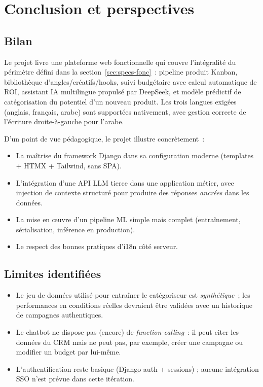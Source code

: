 \section{Conclusion et perspectives}
\label{sec:conclusion}

\subsection{Bilan}

Le projet livre une plateforme web fonctionnelle qui couvre l'intégralité
du périmètre défini dans la section~\ref{sec:specs-fonc}~: pipeline produit
Kanban, bibliothèque d'angles/créatifs/hooks, suivi budgétaire avec calcul
automatique de ROI, assistant IA multilingue propulsé par DeepSeek, et
modèle prédictif de catégorisation du potentiel d'un nouveau produit. Les
trois langues exigées (anglais, français, arabe) sont supportées
nativement, avec gestion correcte de l'écriture droite-à-gauche pour
l'arabe.

D'un point de vue pédagogique, le projet illustre concrètement~:
\begin{itemize}
    \item La maîtrise du framework Django dans sa configuration moderne
    (templates + HTMX + Tailwind, sans SPA).
    \item L'intégration d'une API LLM tierce dans une application métier,
    avec injection de contexte structuré pour produire des réponses
    \emph{ancrées} dans les données.
    \item La mise en œuvre d'un pipeline ML simple mais complet
    (entraînement, sérialisation, inférence en production).
    \item Le respect des bonnes pratiques d'i18n côté serveur.
\end{itemize}

\subsection{Limites identifiées}

\begin{itemize}
    \item Le jeu de données utilisé pour entraîner le catégoriseur est
    \emph{synthétique}~; les performances en conditions réelles devraient
    être validées avec un historique de campagnes authentiques.
    \item Le chatbot ne dispose pas (encore) de \emph{function-calling}~:
    il peut citer les données du CRM mais ne peut pas, par exemple, créer
    une campagne ou modifier un budget par lui-même.
    \item L'authentification reste basique (Django auth + sessions) ;
    aucune intégration SSO n'est prévue dans cette itération.
\end{itemize}

